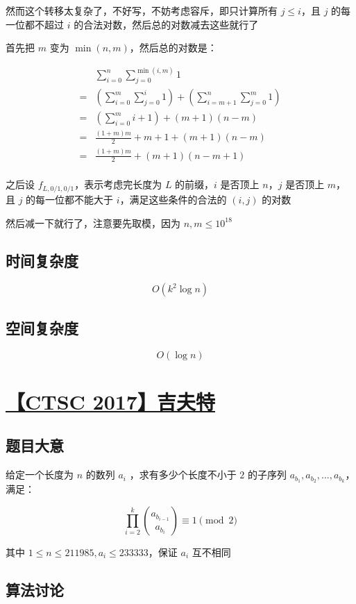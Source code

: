 \documentclass[UTF8]{article}
\begin{document}
然而这个转移太复杂了，不好写，不妨考虑容斥，即只计算所有 $j \le i$，且 $j$ 的每一位都不超过 $i$ 的合法对数，然后总的对数减去这些就行了

首先把 $m$ 变为 $\min(n,m)$，然后总的对数是：

$$
\begin{aligned}
  &\sum_{i=0}^{n}\sum_{j=0}^{\min(i,m)} 1 \\
= &\left(\sum_{i=0}^{m}\sum_{j=0}^{i} 1\right)+\left(\sum_{i=m+1}^{n}\sum_{j=0}^{m}1\right) \\
= &\left(\sum_{i=0}^{m}i+1\right)+(m+1)(n-m) \\
= &\frac{(1+m)m}{2}+m+1+(m+1)(n-m) \\
= &\frac{(1+m)m}{2}+(m+1)(n-m+1) \\
\end{aligned}
$$

之后设 $f_{L,0/1,0/1}$，表示考虑完长度为 $L$ 的前缀，$i$ 是否顶上 $n$，$j$ 是否顶上 $m$，且 $j$ 的每一位都不能大于 $i$，满足这些条件的合法的 $(i,j)$ 的对数

然后减一下就行了，注意要先取模，因为 $n,m \le 10^{18}$

\subsection{时间复杂度}

$$
O(k^2 \log n)
$$

\subsection{空间复杂度}

$$
O(\log n)
$$

\section{\href{http://uoj.ac/problem/300}{【CTSC 2017】吉夫特}}

\subsection{题目大意}

给定一个长度为 $n$ 的数列 $a_i$ ，求有多少个长度不小于 $2$ 的子序列 $a_{b_1},a_{b_2}, \dots ,a_{b_k}$，满足：

$$
\prod_{i=2}^{k} {a_{b_{i-1}} \choose a_{b_{i}}} \equiv 1 \pmod{2}
$$

其中 $1 \le n \le 211985, a_i \le 233333$，保证 $a_i$ 互不相同

\subsection{算法讨论}
\end{document}
